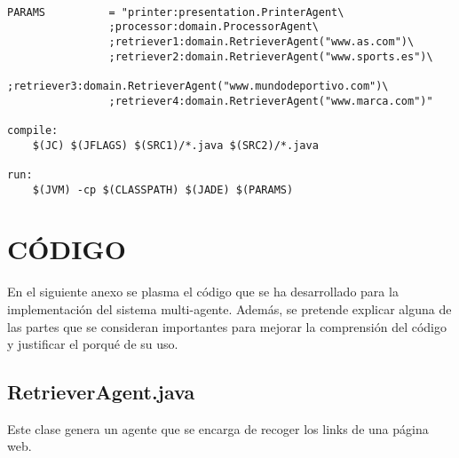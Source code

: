 \documentclass{pre-tfg}
\begin{document}
\begin{lstlisting}[caption=Makefile,style=makefile]

PARAMS 			= "printer:presentation.PrinterAgent\
				;processor:domain.ProcessorAgent\
				;retriever1:domain.RetrieverAgent("www.as.com")\
				;retriever2:domain.RetrieverAgent("www.sports.es")\
				;retriever3:domain.RetrieverAgent("www.mundodeportivo.com")\
				;retriever4:domain.RetrieverAgent("www.marca.com")" 

compile:
	$(JC) $(JFLAGS) $(SRC1)/*.java $(SRC2)/*.java

run:
	$(JVM) -cp $(CLASSPATH) $(JADE) $(PARAMS)
\end{lstlisting}

\newpage

\appendix
\section{CÓDIGO}

En el siguiente anexo se plasma el código que se ha desarrollado para la implementación del sistema multi-agente. Además,
se pretende explicar alguna de las partes que se consideran importantes para mejorar la comprensión del código y justificar
el porqué de su uso.

\subsection{RetrieverAgent.java}

Este clase genera un agente que se encarga de recoger los links de una página web.
\end{document}
